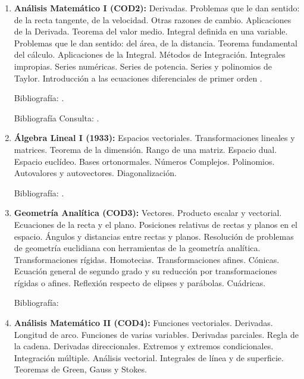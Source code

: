 \documentclass[a4paper, 12pt]{article}
\begin{document}
\begin{enumerate}
\item \textbf{Análisis Matemático I (COD2):}   Derivadas.  Problemas que le dan sentido: de la recta tangente, de la velocidad. Otras razones de cambio. Aplicaciones de la Derivada. Teorema del valor medio. Integral definida en una variable.  Problemas que le dan sentido:  del área, de la distancia. Teorema fundamental del cálculo. Aplicaciones de la Integral. Métodos de Integración. Integrales impropias. Series numéricas. Series de potencia. Series y polinomios  de Taylor.  Introducción a las ecuaciones diferenciales de primer orden .

Bibliografía: \cite{PeterD.Lax631,MichaelSpivak649,thomas2005calculo,GeorgeFinlaySimmons487,thomas2005calculo}.
 

Bibliografía Consulta: \cite{ErnstHairer633,DavidApplebaum639,OttoToeplitz642,DavidBressoud643,DavidM.Bressoud651,DavidM.Bressoud688}.


\item \textbf{Álgebra Lineal I (1933):} Espacios vectoriales. Transformaciones
lineales y matrices. Teorema de la dimensión. Rango de una matriz.
Espacio dual. Espacio euclídeo. Bases ortonormales. Números Complejos. Polinomios.
Autovalores y autovectores. Diagonalización.

Bibliografía: \cite{hoffman, strang}.


\item \textbf{Geometría Analítica (COD3):} 
Vectores. Producto escalar y vectorial. Ecuaciones de la recta y el plano. Posiciones relativas de rectas y planos en el espacio. Ángulos y distancias entre rectas y planos. Resolución de problemas de geometría euclidiana con herramientas de la geometría analítica. Transformaciones rígidas. Homotecias. Transformaciones afines. Cónicas. Ecuación general de segundo grado y su reducción por transformaciones rígidas o afines. Reflexión respecto de elipses y parábolas. Cuádricas.



Bibliografía: \cite{H.S.M.Coxeter226,DavidABrannan247,MicheleAudin38,RogerFenn248,VagnLundsgaardHansen85,C.G.Gibson97,GeorgeA.Jennings273,ArsenyV.Akopyan95,IlkaAgricola77}


\item \textbf{Análisis Matemático II (COD4):} Funciones vectoriales. Derivadas. Longitud de
arco. Funciones de varias variables. Derivadas parciales. Regla de
la cadena. Derivadas direccionales. Extremos y extremos
condicionales. Integración múltiple. Análisis vectorial.
Integrales de línea y de superficie. Teoremas de Green, Gauss y
Stokes.


\end{enumerate}
\end{document}
